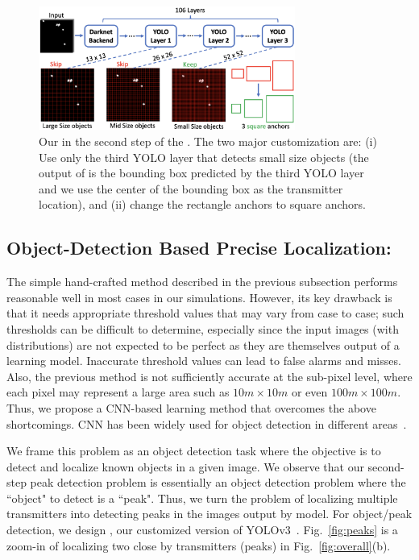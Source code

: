 \begin{figure}
	\centering
	\includegraphics[width=0.75\textwidth]{chapters/wowmom-pmc/figures/yolo.png}
	\vspace{-0.1in}
	\caption{Our \yolocust in the second step of the \our. The two major customization are: (i) Use only the third YOLO layer that detects small size objects (the output of \yolocust is the bounding box predicted by the third YOLO layer and we use the center of the bounding box as the transmitter location), and (ii) change the rectangle anchors to square anchors.}
	\label{fig:yolo}
\end{figure}

\subsection{\bf Object-Detection Based Precise Localization: \yolocust} 

The simple hand-crafted method described in the previous subsection performs reasonable well in most cases in our simulations. 
However, its key drawback is that it needs appropriate threshold values that may vary from case to case; such thresholds can be difficult to determine, especially since
the input images (with distributions) are not expected to be perfect as they are themselves output of a learning model.
Inaccurate threshold values can lead to false alarms and misses. 
Also, the previous method is not sufficiently accurate at the sub-pixel level, where
each pixel may represent a large area such as $10m \times 10m$ or even $100m \times 100m$. Thus,
we propose a CNN-based learning method that overcomes the above shortcomings.  
CNN has been widely used for object detection in different areas~\cite{objectdetectionsurvey,alizadeh21}.

We frame this problem as an object detection task where the objective is to detect and localize
known objects in a given image. We observe that our second-step peak detection problem is essentially an object detection problem where the ``object" to detect is a ``peak".
Thus, we turn the \mtl problem of localizing multiple transmitters into detecting 
peaks in the images output by \imgimg model. 
For object/peak detection, we design \yolocust, our customized version of YOLOv3~\cite{yolov3}.
Fig.~\ref{fig:peaks} is a zoom-in of localizing two close by transmitters (peaks) in Fig.~\ref{fig:overall}(b).

